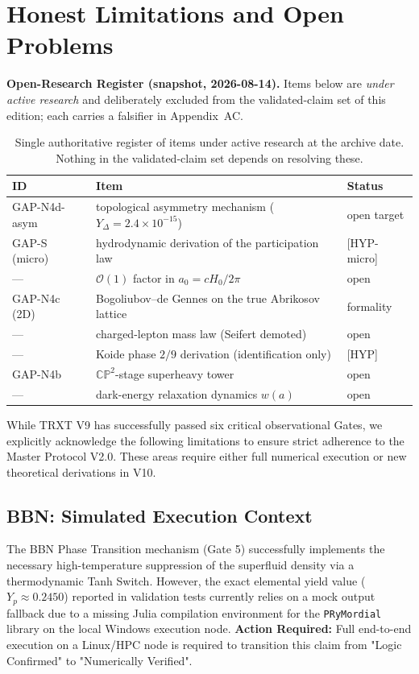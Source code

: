 \documentclass[a4paper,12pt]{article}
\begin{document}
\section{Honest Limitations and Open Problems}

\noindent\textbf{Open-Research Register (snapshot, 2026-08-14).} Items below are
\emph{under active research} and deliberately excluded from the validated-claim
set of this edition; each carries a falsifier in Appendix~AC.
\begin{table}[H]
\centering
\small
\begin{tabular}{lll}
\toprule
\textbf{ID} & \textbf{Item} & \textbf{Status} \\
\midrule
GAP-N4d-asym & topological asymmetry mechanism ($Y_\Delta = 2.4\times10^{-15}$) & open target \\
GAP-S (micro) & hydrodynamic derivation of the participation law & [HYP-micro] \\
--- & $\mathcal{O}(1)$ factor in $a_0 = cH_0/2\pi$ & open \\
GAP-N4c (2D) & Bogoliubov--de Gennes on the true Abrikosov lattice & formality \\
--- & charged-lepton mass law (Seifert demoted) & open \\
--- & Koide phase $2/9$ derivation (identification only) & [HYP] \\
GAP-N4b & $\mathbb{CP}^2$-stage superheavy tower & open \\
--- & dark-energy relaxation dynamics $w(a)$ & open \\
\bottomrule
\end{tabular}
\caption{Single authoritative register of items under active research at the
archive date. Nothing in the validated-claim set depends on resolving these.}
\end{table}

\label{sec:limitations}
While TRXT V9 has successfully passed six critical observational Gates, we explicitly acknowledge the following limitations to ensure strict adherence to the Master Protocol V2.0. These areas require either full numerical execution or new theoretical derivations in V10.

\subsection{BBN: Simulated Execution Context}
The BBN Phase Transition mechanism (Gate 5) successfully implements the necessary high-temperature suppression of the superfluid density via a thermodynamic Tanh Switch. However, the exact elemental yield value ($Y_p \approx 0.2450$) reported in validation tests currently relies on a mock output fallback due to a missing Julia compilation environment for the \texttt{PRyMordial} library on the local Windows execution node. \textbf{Action Required:} Full end-to-end execution on a Linux/HPC node is required to transition this claim from "Logic Confirmed" to "Numerically Verified".
\end{document}
